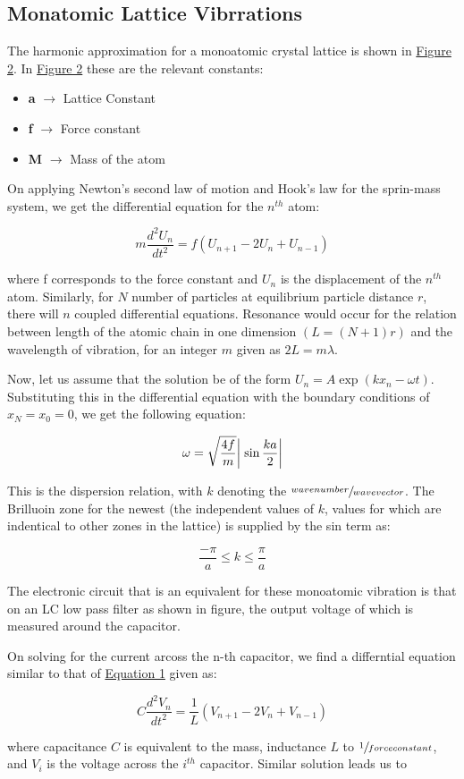 	\subsection{Monatomic Lattice Vibrrations}

		The harmonic approximation for a monoatomic crystal lattice is shown in \hyperref[fig:theory2]{Figure 2}. In \hyperref[fig:theory2]{Figure 2} these are the relevant constants:
		\begin{itemize}
			\item \textbf{a} $\rightarrow$ Lattice Constant
			\item \textbf{f} $\rightarrow$ Force constant
			\item \textbf{M} $\rightarrow$ Mass of the atom
		\end{itemize}

		On applying Newton's second law of motion and Hook's law for the sprin-mass system, we get the differential equation for the $n^{th}$ atom:

		\begin{equation}
			m \frac{d^2U_n}{dt^2} = f(U_{n+1} - 2U_n + U_{n-1})
			\label{eqn:1}
		\end{equation}

		where f corresponds to the force constant and $U_n$ is the displacement of the $n^{th}$ atom. Similarly, for $N$ number of particles at equilibrium particle distance $r$, there will $n$ coupled differential equations. Resonance would occur for the relation between length of the atomic chain in one dimension $(L = (N+1)r)$ and the wavelength of vibration, for an integer $m$ given as $2L = m\lambda$.
		
		Now, let us assume that the solution be of the form $U_n = A \exp(kx_n-\omega t)$. Substituting this in the differential equation with the boundary conditions of $x_N = x_0 = 0$, we get the following equation:

		$$\omega = \sqrt{\frac{4f}{m}}\abs{\;\sin\frac{ka}{2}}$$

		This is the dispersion relation, with $k$ denoting the $\sfrac{wavenumber}{wavevector}$. The Brilluoin zone for the newest (the independent values of $k$, values for which are indentical to other zones in the lattice) is supplied by the sin term as:

		$$\frac{-\pi}{a}\leq k \leq \frac{\pi}{a}$$

		The electronic circuit that is an equivalent for these monoatomic vibration is that on an LC low pass filter as shown in figure, the output voltage of which is measured around the capacitor.

		On solving for the current arcoss the n-th capacitor, we find a differntial equation similar to that of \hyperref[eqn:1]{Equation 1} given as:

		$$C\frac{d^2V_n}{dt^2} = \frac{1}{L}(V_{n+1} - 2V_n + V_{n-1})$$

		where capacitance $C$ is equivalent to the mass, inductance $L$ to $\sfrac{1}{force constant}$, and $V_i$ is the voltage across the $i^{th}$ capacitor. Similar solution leads us to